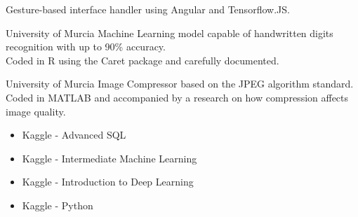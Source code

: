 \documentclass[10pt,a4paper]{altacv}
\begin{document}
Gesture-based interface handler using Angular and Tensorflow.JS. \newline

 {University of Murcia}
Machine Learning model capable of handwritten digits recognition with up to 90\% accuracy.\\
Coded in R using the Caret package and carefully documented.

\divider
{} {University of Murcia}
Image Compressor based on the JPEG algorithm standard.\\
Coded in MATLAB and accompanied by a research on how compression affects image quality.

\divider


\begin{itemize}
    \item Kaggle - Advanced SQL
    \item Kaggle - Intermediate Machine Learning
    \item Kaggle - Introduction to Deep Learning
    \item Kaggle - Python
\end{itemize}
\end{document}
